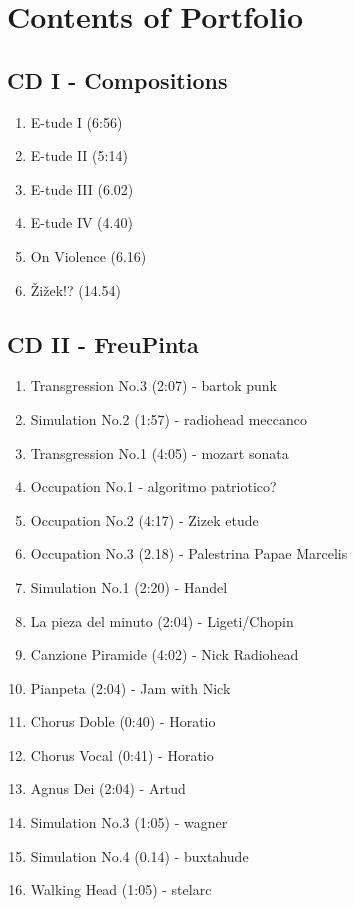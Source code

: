 \chapter*{Contents of Portfolio}

\section*{CD I - Compositions}

\begin{enumerate}
\item E-tude I (6:56)
\item E-tude II (5:14)
\item E-tude III (6.02)
\item E-tude IV (4.40)
\item On Violence (6.16)
\item \v{Z}i\v{z}ek!? (14.54)
\end{enumerate}

\section*{CD II - FreuPinta}

\begin{enumerate}
\item Transgression No.3 (2:07) - bartok punk
\item Simulation No.2 (1:57) - radiohead meccanco
\item Transgression No.1 (4:05) - mozart sonata
\item Occupation No.1 - algoritmo patriotico?
\item Occupation No.2 (4:17) - Zizek etude
\item Occupation No.3 (2.18) - Palestrina Papae Marcelis
\item Simulation No.1 (2:20) - Handel
\item La pieza del minuto (2:04) - Ligeti/Chopin
\item Canzione Piramide (4:02) - Nick Radiohead
\item Pianpeta (2:04) - Jam with Nick
\item Chorus Doble (0:40) - Horatio
\item Chorus Vocal (0:41) - Horatio
\item Agnus Dei (2:04) - Artud
\item Simulation No.3 (1:05) - wagner
\item Simulation No.4 (0.14) - buxtahude
\item Walking Head (1:05) - stelarc
\end{enumerate}

